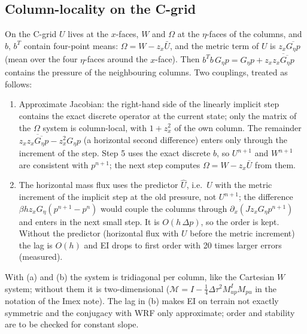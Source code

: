 \documentclass[11pt,a4paper]{article}
\newcommand{\dtau}{\Delta\tau}
\begin{document}
\subsection{Column-locality on the C-grid}
On the C-grid $U$ lives at the $x$-faces, $W$ and $\Omega$ at the $\eta$-faces of the columns, and $b$, $b^T$ contain four-point
means: $\Omega=W-z_x\bar U$, and the metric term of $U$ is $z_x\overline{G_\eta p}$ (mean over the four $\eta$-faces around the
$x$-face). Then $b^Tb\,G_\eta p=G_\eta p+z_x\overline{z_x\overline{G_\eta p}}$ contains the pressure of the neighbouring columns. Two
couplings, treated as follows:
\begin{enumerate}
\item[(a)] Approximate Jacobian: the right-hand side of the linearly implicit step contains the exact
discrete operator at the current state; only the matrix of the $\Omega$ system is column-local, with
$1+z_x^2$ of the own column. The remainder $z_x\overline{z_x\overline{G_\eta p}}-z_x^2G_\eta p$ (a horizontal second difference) enters only
through the increment of the step. Step 5 uses the exact discrete $b$, so $U^{n+1}$ and $W^{n+1}$ are consistent
with $p^{n+1}$; the next step computes $\Omega=W-z_x\bar U$ from them.
\item[(b)] The horizontal mass flux uses the predictor $\hat U$, i.e.\ $U$ with the metric increment of the implicit
step at the old pressure, not $U^{n+1}$; the difference $\beta hz_xG_\eta(p^{n+1}-p^n)$ would couple the columns through
$\partial_x(Jz_xG_\eta p^{n+1})$ and enters in the next small step. It is $O(h\,\Delta p)$, so the order is kept. Without the predictor
(horizontal flux with $U$ before the metric increment) the lag is $O(h)$ and EI drops to first order with 20 times
larger errors (measured).
\end{enumerate}
With (a) and (b) the system is tridiagonal per column, like the Cartesian $W$ system; without them it is
two-dimensional ($\mathcal M=I-\tfrac14\dtau^2M^I_{up}M_{pu}$ in the notation of the Imex note). The lag in (b) makes EI on
terrain not exactly symmetric and the conjugacy with WRF only approximate; order and stability are to
be checked for constant slope.
\end{document}
